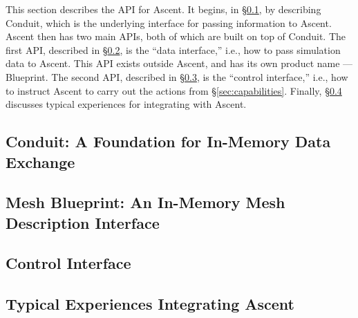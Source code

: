 This section describes the API for Ascent.
%
It begins, in \S\ref{Conduit}, by describing Conduit, which is the underlying
interface for passing information to Ascent.
%
Ascent then has two main APIs, both of which are built on top of Conduit.
%
%
The first API, described in \S\ref{Blueprint}, is the ``data interface,'' i.e., how
to pass simulation data to Ascent.
%
This API exists outside Ascent, and has its own product name --- Blueprint.
%
The second API, described in \S\ref{ascent_control}, is the ``control interface,''
i.e., how to instruct Ascent to carry out the actions from \S\ref{sec:capabilities}.
%
Finally, \S\ref{api_summary} discusses typical experiences for integrating with Ascent.

\subsection{Conduit: A Foundation for In-Memory Data Exchange}
\label{Conduit}


\subsection{Mesh Blueprint: An In-Memory Mesh Description Interface}
\label{Blueprint}


\subsection{Control Interface}
\label{ascent_control}


\subsection{Typical Experiences Integrating Ascent}
\label{api_summary}




